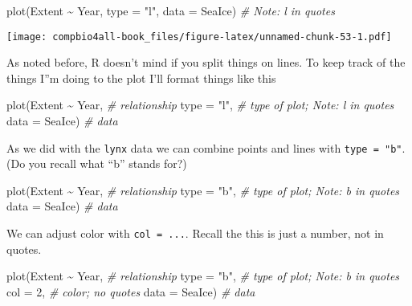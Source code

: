 \documentclass[
]{book}
\newenvironment{Shaded}{\begin{snugshade}}{\end{snugshade}}
\newcommand{\AttributeTok}[1]{\textcolor[rgb]{0.77,0.63,0.00}{#1}}
\newcommand{\CommentTok}[1]{\textcolor[rgb]{0.56,0.35,0.01}{\textit{#1}}}
\newcommand{\DecValTok}[1]{\textcolor[rgb]{0.00,0.00,0.81}{#1}}
\newcommand{\FunctionTok}[1]{\textcolor[rgb]{0.00,0.00,0.00}{#1}}
\newcommand{\NormalTok}[1]{#1}
\newcommand{\SpecialCharTok}[1]{\textcolor[rgb]{0.00,0.00,0.00}{#1}}
\newcommand{\StringTok}[1]{\textcolor[rgb]{0.31,0.60,0.02}{#1}}
\begin{document}
\begin{Shaded}
\begin{Highlighting}[]
\FunctionTok{plot}\NormalTok{(Extent }\SpecialCharTok{\textasciitilde{}}\NormalTok{ Year, }\AttributeTok{type =} \StringTok{"l"}\NormalTok{, }\AttributeTok{data =}\NormalTok{ SeaIce)  }\CommentTok{\# Note: l in quotes}
\end{Highlighting}
\end{Shaded}

\texttt{[image: compbio4all-book\_files/figure-latex/unnamed-chunk-53-1.pdf]}

As noted before, R doesn't mind if you split things on lines. To keep track of the things I''m doing to the plot I'll format things like this

\begin{Shaded}
\begin{Highlighting}[]
\FunctionTok{plot}\NormalTok{(Extent }\SpecialCharTok{\textasciitilde{}}\NormalTok{ Year,  }\CommentTok{\# relationship}
     \AttributeTok{type =} \StringTok{"l"}\NormalTok{,     }\CommentTok{\# type of plot; Note: l in quotes}
     \AttributeTok{data =}\NormalTok{ SeaIce)  }\CommentTok{\# data}
\end{Highlighting}
\end{Shaded}

As we did with the \texttt{lynx} data we can combine points and lines with \texttt{type\ =\ "b"}. (Do you recall what ``b'' stands for?)

\begin{Shaded}
\begin{Highlighting}[]
\FunctionTok{plot}\NormalTok{(Extent }\SpecialCharTok{\textasciitilde{}}\NormalTok{ Year,  }\CommentTok{\# relationship}
     \AttributeTok{type =} \StringTok{"b"}\NormalTok{,     }\CommentTok{\# type of plot; Note: b in quotes}
     \AttributeTok{data =}\NormalTok{ SeaIce)  }\CommentTok{\# data}
\end{Highlighting}
\end{Shaded}

We can adjust color with \texttt{col\ =\ ...}. Recall the this is just a number, not in quotes.

\begin{Shaded}
\begin{Highlighting}[]
\FunctionTok{plot}\NormalTok{(Extent }\SpecialCharTok{\textasciitilde{}}\NormalTok{ Year,  }\CommentTok{\# relationship}
     \AttributeTok{type =} \StringTok{"b"}\NormalTok{,     }\CommentTok{\# type of plot; Note: b in quotes}
     \AttributeTok{col =} \DecValTok{2}\NormalTok{,        }\CommentTok{\# color; no quotes}
     \AttributeTok{data =}\NormalTok{ SeaIce)  }\CommentTok{\# data}
\end{Highlighting}
\end{Shaded}
\end{document}
